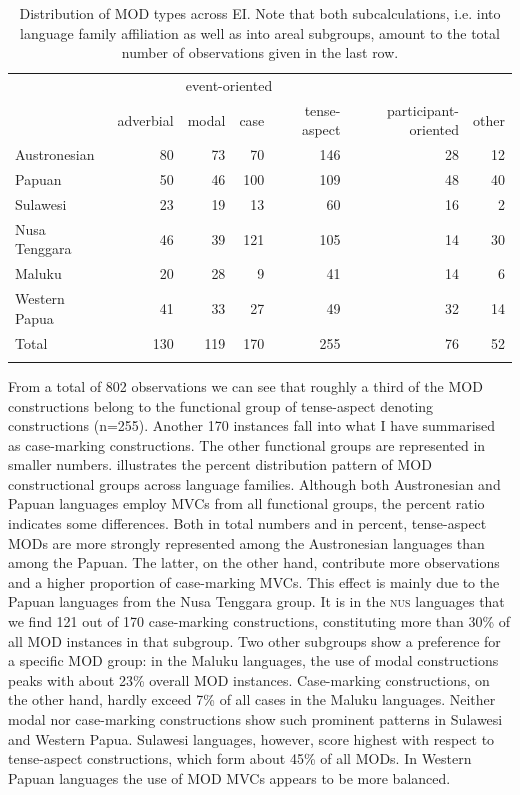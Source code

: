 \begin{table}
\begin{tabular}{lrrrr|rr}
  \lsptoprule
& \multicolumn{4}{c}{event-oriented} & & \\
 & {adverbial} & {modal} & {case} & {tense-aspect} & {participant-oriented} & {other}\\  
  \midrule
  Austronesian & 80 & 73 & 70 & 146 & 28 & 12 \tabularnewline
  Papuan & 50 & 46 & 100 & 109 & 48 & 40 \tabularnewline
   \midrule
  Sulawesi & 23 & 19 & 13 & 60 & 16 & 2 \tabularnewline
  Nusa Tenggara & 46 & 39 & 121 & 105 & 14 & 30 \tabularnewline
  Maluku & 20 & 28 & 9 & 41 & 14 & 6 \tabularnewline 
  Western Papua & 41 & 33 & 27 & 49 & 32 & 14 \tabularnewline 
\midrule
Total & 130 & 119 & 170 & 255 & 76 & 52 \tabularnewline
\lspbottomrule
\end{tabular}
\caption[Distribution of MOD types across EI]{Distribution of MOD types across EI. Note that both subcalculations, i.e. into language family affiliation as well as into areal subgroups,  amount to the total number of observations given in the last row.}
\label{table:MOD_overview}
\end{table}

From a total of 802 observations we can see that roughly a third of the MOD constructions belong to the functional group of tense-aspect denoting constructions (n=255). Another 170 instances fall into what I have summarised as case-marking constructions. The other functional groups are represented in smaller numbers.  illustrates the percent distribution pattern of MOD constructional groups across language families. Although both Austronesian and Papuan languages employ MVCs from all functional groups, the percent ratio indicates some differences. Both in total numbers and in percent, tense-aspect MODs are more strongly represented among the Austronesian languages than among the Papuan. The latter, on the other hand, contribute more observations and a higher proportion of case-marking MVCs. This effect is mainly due to the Papuan languages from the Nusa Tenggara group. It is in the \textsc{nus} languages that we find 121 out of 170 case-marking constructions, constituting more than 30\% of all MOD instances in that subgroup. Two other subgroups show a preference for a specific MOD group: in the Maluku languages, the use of modal constructions peaks with about 23\% overall MOD instances. Case-marking constructions, on the other hand, hardly exceed 7\% of all cases in the Maluku languages. Neither modal nor case-marking constructions show such prominent patterns in Sulawesi and Western Papua. Sulawesi languages, however, score highest with respect to tense-aspect constructions, which form about 45\% of all MODs. In Western Papuan languages the use of MOD MVCs appears to be more balanced.

